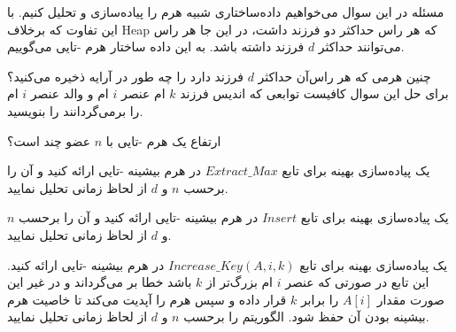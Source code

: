 ‌مسئله
در این سوال می‌خواهیم داده‌ساختاری شبیه هرم
را پیاده‌سازی و تحلیل کنیم. با این تفاوت که برخلاف Heap که هر راس حداکثر دو فرزند داشت، در این جا هر راس می‌توانند حداکثر $d$ فرزند داشته باشد. به این داده ساختار هرم -تایی
می‌گوییم.

چنین هرمی که هر راس‌‌آن حداکثر $d$ فرزند دارد را چه طور در آرایه ذخیره می‌کنید؟ برای حل این سوال کافیست توابعی که اندیس فرزند $k$ ام عنصر $i$ ام و والد عنصر $i$ ام را برمی‌گردانند را بنویسید.

ارتفاع یک هرم -تایی با $n$ عضو چند است؟

یک پیاده‌سازی بهینه برای تابع $Extract\_Max$ در هرم بیشینه -تایی ارائه کنید و آن را برحسب $n$ و $d$ از لحاظ زمانی تحلیل نمایید.

یک پیاده‌سازی بهینه برای تابع $Insert$ در هرم بیشینه -تایی ارائه کنید و آن را برحسب $n$ و $d$ از لحاظ زمانی تحلیل نمایید.

یک پیاده‌سازی بهینه برای تابع $Increase\_Key(A,i,k)$ در هرم بیشینه -تایی ارائه کنید. این تابع در صورتی که عنصر $i$ ام بزرگ‌تر از $k$ باشد خطا بر می‌گرداند و در غیر این صورت مقدار $A[i]$ را برابر $k$ قرار داده و سپس هرم را آپدیت می‌کند تا خاصیت هرم بیشینه بودن آن حفظ شود. الگوریتم را برحسب $n$ و $d$ از لحاظ زمانی تحلیل نمایید.



